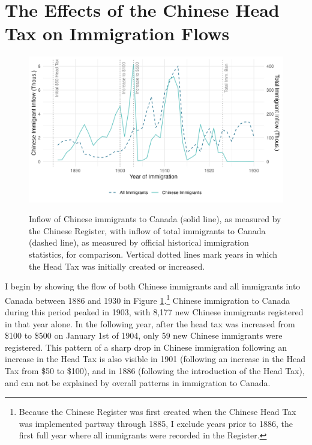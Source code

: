 
\section{The Effects of the Chinese Head Tax on Immigration Flows}




\begin{figure}[h!]
    \centering 
    \caption{Inflow of Chinese immigrants to Canada (solid line), as measured by the Chinese Register, with inflow of total immigrants to Canada (dashed line), as measured by official historical immigration statistics, for comparison. Vertical dotted lines mark years in which the Head Tax was initially created or increased.}
    \includegraphics[width=\textwidth]{../../figs/fig2_flow.png}
    \label{fig:inflow}
\end{figure}

I begin by showing the flow of both Chinese immigrants and all immigrants into Canada between 1886 and 1930 in Figure \ref{fig:inflow}.\footnote{Because the Chinese Register was first created when the Chinese Head Tax was implemented partway through 1885, I exclude years prior to 1886, the first full year where all immigrants were recorded in the Register.}
Chinese immigration to Canada during this period peaked in 1903, with 8,177 new Chinese immigrants registered in that year alone. In the following year, after the head tax was increased from \$100 to \$500 on January 1st of 1904, only 59 new Chinese immigrants were registered. This pattern of a sharp drop in Chinese immigration following an increase in the Head Tax is also visible in 1901 (following an increase in the Head Tax from \$50 to \$100), and in 1886 (following the introduction of the Head Tax), and can not be explained by overall patterns in immigration to Canada.

